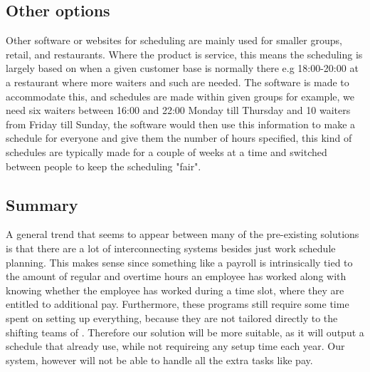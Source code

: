 \subsection{Other options}
Other software or websites for scheduling are mainly used for smaller groups, retail, and restaurants. Where the product is service, this means the scheduling is largely based on when a given customer base is normally there e.g 18:00-20:00 at a restaurant where more waiters and such are needed. The software is made to accommodate this, and schedules are made within given groups for example, we need six waiters between 16:00 and 22:00 Monday till Thursday and 10 waiters from Friday till Sunday, the software would then use this information to make a schedule for everyone and give them the number of hours specified, this kind of schedules are typically made for a couple of weeks at a time and switched between people to keep the scheduling "fair".

\subsection{Summary}
A general trend that seems to appear between many of the pre-existing solutions is that there are a lot of interconnecting systems besides just work schedule planning. This makes sense since something like a payroll is intrinsically tied to the amount of regular and overtime hours an employee has worked along with knowing whether the employee has worked during a time slot, where they are entitled to additional pay. Furthermore, these programs still require some time spent on setting up everything, because they are not tailored directly to the shifting teams of \siemens. Therefore our solution will be more suitable, as it will output a schedule that \siemens already use, while not requireing any setup time each year. Our system, however will not be able to handle all the extra tasks like pay.